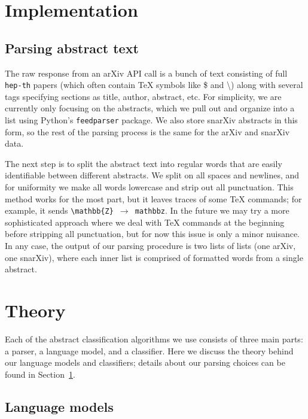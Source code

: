\documentclass{article}
\begin{document}
\section{Implementation} \label{sec:implementation} %
\subsection{Parsing abstract text}
The raw response from an arXiv API call is a bunch of text consisting of full \texttt{hep-th} papers (which often contain TeX symbols like \$ and  \textbackslash) along with several tags specifying sections as title, author, abstract, etc.
For simplicity, we are currently only focusing on the abstracts, which we pull out and organize into a list using Python's \texttt{feedparser} package.
We also store snarXiv abstracts in this form, so the rest of the parsing process is the same for the arXiv and snarXiv data.

The next step is to split the abstract text into regular words that are easily identifiable between different abstracts.
We split on all spaces and newlines, and for uniformity we make all words lowercase and strip out all punctuation.
This method works for the most part, but it leaves traces of some TeX commands; for example, it sends \texttt{\textbackslash mathbb\{Z\} $\to$ mathbbz}.
In the future we may try a more sophisticated approach where we deal with TeX commands at the beginning before stripping all punctuation, but for now this issue is only a minor nuisance.
In any case, the output of our parsing procedure is two lists of lists (one arXiv, one snarXiv), where each inner list is comprised of formatted words from a single abstract.


\section{Theory}
Each of the abstract classification algorithms we use consists of three main parts: a parser, a language model, and a classifier.
Here we discuss the theory behind our language models and classifiers; details about our parsing choices can be found in Section~\ref{sec:implementation}.
 
\subsection{Language models} \label{sec:LMs}
\end{document}
